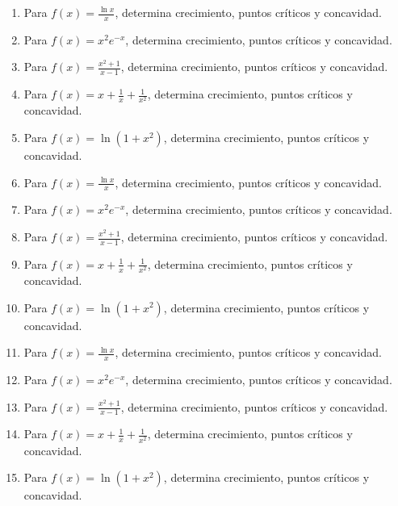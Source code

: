 \documentclass[11pt,a4paper]{article}
\begin{document}
\begin{enumerate}[label=\textbf{E\arabic*.},start=181]

\item Para $f(x)=\frac{\ln x}{x}$, determina crecimiento, puntos críticos y concavidad.

\item Para $f(x)=x^2e^{-x}$, determina crecimiento, puntos críticos y concavidad.

\item Para $f(x)=\frac{x^2+1}{x-1}$, determina crecimiento, puntos críticos y concavidad.

\item Para $f(x)=x+\frac{1}{x}+\frac{1}{x^2}$, determina crecimiento, puntos críticos y concavidad.

\item Para $f(x)=\ln(1+x^2)$, determina crecimiento, puntos críticos y concavidad.

\item Para $f(x)=\frac{\ln x}{x}$, determina crecimiento, puntos críticos y concavidad.

\item Para $f(x)=x^2e^{-x}$, determina crecimiento, puntos críticos y concavidad.

\item Para $f(x)=\frac{x^2+1}{x-1}$, determina crecimiento, puntos críticos y concavidad.

\item Para $f(x)=x+\frac{1}{x}+\frac{1}{x^2}$, determina crecimiento, puntos críticos y concavidad.

\item Para $f(x)=\ln(1+x^2)$, determina crecimiento, puntos críticos y concavidad.

\item Para $f(x)=\frac{\ln x}{x}$, determina crecimiento, puntos críticos y concavidad.

\item Para $f(x)=x^2e^{-x}$, determina crecimiento, puntos críticos y concavidad.

\item Para $f(x)=\frac{x^2+1}{x-1}$, determina crecimiento, puntos críticos y concavidad.

\item Para $f(x)=x+\frac{1}{x}+\frac{1}{x^2}$, determina crecimiento, puntos críticos y concavidad.

\item Para $f(x)=\ln(1+x^2)$, determina crecimiento, puntos críticos y concavidad.


\end{enumerate}
\end{document}
